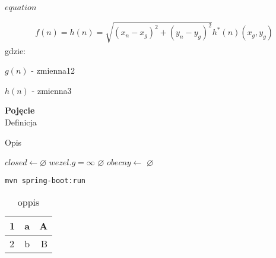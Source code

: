 $equation$

\begin{gather}
 	f(n) = h(n) = \sqrt{(x_n - x_g)^2 + (y_n - y_g)^2} h^*(n) (x_g, y_g)
 	\label{eq_astar} 
\end{gather}
 gdzie:

 $g(n)$ - zmienna12

 $h(n)$ - zmienna3

\begin{definition}{\bf Pojęcie\\}
	Definicja
\end{definition}

\begin{algorithm}[H]
	\caption{Opis}\label{alg:name}
  \begin{algorithmic}[1]
	\State $closed \gets \varnothing$  
		\State $wezel.g = \infty$ 
	\EndFor
	 
		\State \Return $\varnothing$ 
	\EndIf
	 
		\State $obecny \gets $  
	\EndWhile
	\State \Return $\varnothing$ 
\EndFunction
  \end{algorithmic}
\end{algorithm}

\begin{lstlisting}[language=bash]
mvn spring-boot:run
\end{lstlisting}

\begin{table}
\caption{oppis} \label{tab:name} 
\centering
\begin{tabular}{| l | c | r |}
\hline
1 & a & A \\ \hline
2 & b & B \\ \hline
\end{tabular}
\end{table}